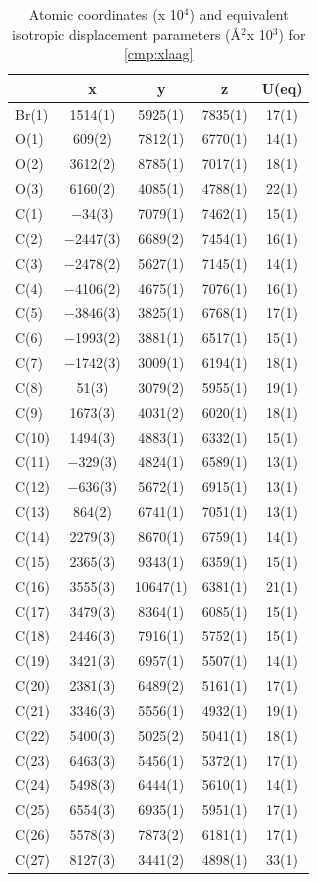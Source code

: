 \twocolumn
\begin{table}[h]
\centering
\caption{Atomic coordinates (x 10$^4$) and equivalent isotropic displacement parameters (\AA$^2$x
10$^3$) for \ref{cmp:xlaag}}
{\footnotesize
\begin{tabular}{lcccc} 
\\
\toprule
& x & y & z & U(eq) \\
\midrule
Br(1)&1514(1)&5925(1)&7835(1)&17(1)\\
O(1)&609(2)&7812(1)&6770(1)&14(1)\\
O(2)&3612(2)&8785(1)&7017(1)&18(1)\\
O(3)&6160(2)&4085(1)&4788(1)&22(1)\\
C(1)&$-$34(3)&7079(1)&7462(1)&15(1)\\
C(2)&$-$2447(3)&6689(2)&7454(1)&16(1)\\
C(3)&$-$2478(2)&5627(1)&7145(1)&14(1)\\
C(4)&$-$4106(2)&4675(1)&7076(1)&16(1)\\
C(5)&$-$3846(3)&3825(1)&6768(1)&17(1)\\
C(6)&$-$1993(2)&3881(1)&6517(1)&15(1)\\
C(7)&$-$1742(3)&3009(1)&6194(1)&18(1)\\
C(8)&51(3)&3079(2)&5955(1)&19(1)\\
C(9)&1673(3)&4031(2)&6020(1)&18(1)\\
C(10)&1494(3)&4883(1)&6332(1)&15(1)\\
C(11)&$-$329(3)&4824(1)&6589(1)&13(1)\\
C(12)&$-$636(3)&5672(1)&6915(1)&13(1)\\
C(13)&864(2)&6741(1)&7051(1)&13(1)\\
C(14)&2279(3)&8670(1)&6759(1)&14(1)\\
C(15)&2365(3)&9343(1)&6359(1)&15(1)\\
C(16)&3555(3)&10647(1)&6381(1)&21(1)\\
C(17)&3479(3)&8364(1)&6085(1)&15(1)\\
C(18)&2446(3)&7916(1)&5752(1)&15(1)\\
C(19)&3421(3)&6957(1)&5507(1)&14(1)\\
C(20)&2381(3)&6489(2)&5161(1)&17(1)\\
C(21)&3346(3)&5556(1)&4932(1)&19(1)\\
C(22)&5400(3)&5025(2)&5041(1)&18(1)\\
C(23)&6463(3)&5456(1)&5372(1)&17(1)\\
C(24)&5498(3)&6444(1)&5610(1)&14(1)\\
C(25)&6554(3)&6935(1)&5951(1)&17(1)\\
C(26)&5578(3)&7873(2)&6181(1)&17(1)\\
C(27)&8127(3)&3441(2)&4898(1)&33(1)\\
\bottomrule
\end{tabular}
}
\end{table} 

